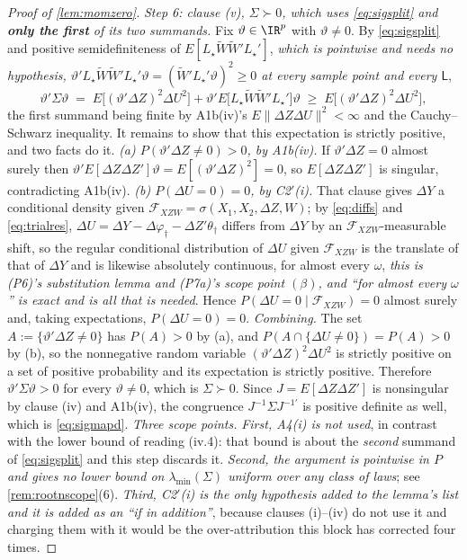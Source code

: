 \begin{proof}[Proof of \cref{lem:momzero}]
\emph{Step 6: clause \textup{(v)}, $\Sigma\succ0$, which uses \eqref{eq:sigsplit} and \textbf{only the
first} of its two summands.} Fix $\vartheta\in\IR^{p}$ with $\vartheta\ne0$. By \eqref{eq:sigsplit} and
positive semidefiniteness of $E[L_\star\widetilde W\widetilde W'L_\star']$, \emph{which is pointwise
and needs no hypothesis, $\vartheta'L_\star\widetilde W\widetilde W'L_\star'\vartheta
=(\widetilde W'L_\star'\vartheta)^{2}\ge0$ at every sample point and every $\mathsf L$}, 
\[
\vartheta'\Sigma\vartheta
\;=\;E\big[(\vartheta'\Delta Z)^{2}\Delta U^{2}\big]+\vartheta'E\big[L_\star\widetilde W\widetilde W'L_\star'\big]\vartheta
\;\ge\;E\big[(\vartheta'\Delta Z)^{2}\Delta U^{2}\big] ,
\]
the first summand being finite by A1b(iv)'s $E\|\Delta Z\Delta U\|^{2}<\infty$ and the Cauchy--Schwarz
inequality. It remains to show that this expectation is strictly positive, and two facts do it.
\emph{(a) $P(\vartheta'\Delta Z\ne0)>0$, by A1b(iv).} If $\vartheta'\Delta Z=0$ almost surely then
$\vartheta'E[\Delta Z\Delta Z']\vartheta=E[(\vartheta'\Delta Z)^{2}]=0$, so $E[\Delta Z\Delta Z']$ is
singular, contradicting A1b(iv). \emph{(b) $P(\Delta U=0)=0$, by C2$'$(i).} That clause gives $\Delta Y$ a
conditional density given $\mathcal F_{XZW}=\sigma(X_1,X_2,\Delta Z,W)$; by \eqref{eq:diffs} and
\eqref{eq:trialres}, $\Delta U=\Delta Y-\Delta\varphi_{\dagger}-\Delta Z'\theta_\dagger$ differs from
$\Delta Y$ by an $\mathcal F_{XZW}$-measurable shift, so the regular conditional distribution of $\Delta U$
given $\mathcal F_{XZW}$ is the translate of that of $\Delta Y$ and is likewise absolutely continuous, for
almost every $\omega$, \emph{this is (P6)'s substitution lemma and (P7a)'s scope point $(\beta)$, and
``for almost every $\omega$'' is exact and is all that is needed}. Hence
$P(\Delta U=0\mid\mathcal F_{XZW})=0$ almost surely and, taking expectations, $P(\Delta U=0)=0$.
\emph{Combining.} The set $A:=\{\vartheta'\Delta Z\ne0\}$ has $P(A)>0$ by (a), and
$P(A\cap\{\Delta U\ne0\})=P(A)>0$ by (b), so the nonnegative random variable
$(\vartheta'\Delta Z)^{2}\Delta U^{2}$ is strictly positive on a set of positive probability and its
expectation is strictly positive. Therefore $\vartheta'\Sigma\vartheta>0$ for every $\vartheta\ne0$, which
is $\Sigma\succ0$. Since $J=E[\Delta Z\Delta Z']$ is nonsingular by clause \textup{(iv)} and A1b(iv), the
congruence $J^{-1}\Sigma J^{-1\prime}$ is positive definite as well, which is \eqref{eq:sigmapd}.
\emph{Three scope points.} \emph{First, A4(i) is not used}, in contrast with the lower bound of reading
\textup{(iv.4)}: that bound is about the \emph{second} summand of \eqref{eq:sigsplit} and this step
discards it. \emph{Second, the argument is pointwise in $P$ and gives no lower bound on
$\lambda_{\min}(\Sigma)$ uniform over any class of laws}; see \cref{rem:rootnscope}\textup{(6)}.
\emph{Third, C2$'$(i) is the only hypothesis added to the lemma's list and it is added as an ``if in
addition''}, because clauses \textup{(i)}--\textup{(iv)} do not use it and charging them with it would be
the over-attribution this block has corrected four times.
\end{proof}

